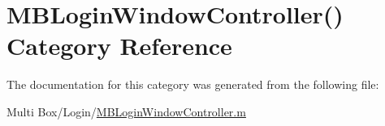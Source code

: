 \hypertarget{category_m_b_login_window_controller_07_08}{\section{M\-B\-Login\-Window\-Controller() Category Reference}
\label{category_m_b_login_window_controller_07_08}
}


The documentation for this category was generated from the following file\-:\begin{DoxyCompactItemize}
\item 
Multi Box/\-Login/\hyperlink{_m_b_login_window_controller_8m}{M\-B\-Login\-Window\-Controller.\-m}\end{DoxyCompactItemize}
